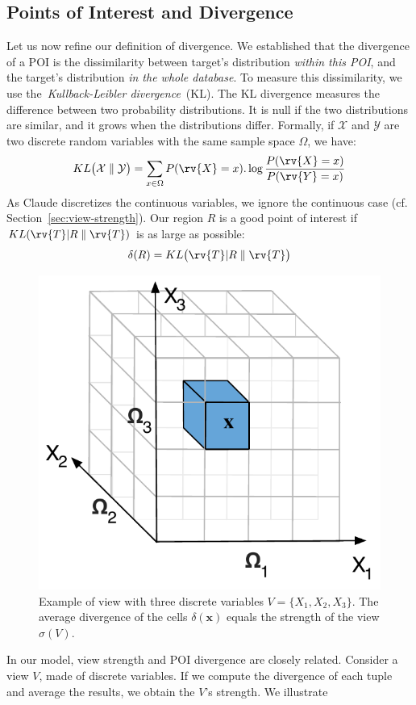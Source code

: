 \subsection{Points of Interest and Divergence}
Let us now refine our definition of divergence. We established that the
divergence of a POI is the dissimilarity between target's distribution
\emph{within this POI}, and the target's distribution \emph{in the whole
database}.  To measure this dissimilarity, we use the~\emph{Kullback-Leibler
divergence}~(KL).  The KL divergence measures the difference between two
probability distributions. It is null if the two distributions are similar, and
it grows when the distributions differ.  Formally, if $\mathcal{X}$ and
$\mathcal{Y}$ are two discrete random variables with the same sample space
$\Omega$, we have:
\begin{equation}\label{eq:KL_disc} 
    KL\big( \mathcal{X} \parallel \mathcal{Y} \big) = 
    \sum_{x\in \Omega} P(\rv{X} = x).\log{\frac{P(\rv{X} = x)}{P(\rv{Y} = x)}} 
\end{equation}
As Claude discretizes the continuous variables, we ignore the continuous case
(cf.  Section~\ref{sec:view-strength}). Our region $R$ is a good point of
interest if $KL ( \rv{T} |R \parallel \rv{T} )$ is as large as possible:
\begin{equation}\label{eq:divergence}
    \delta(R) = KL \big( \rv{T} | R \parallel \rv{T}\big)
\end{equation}
\begin{figure}[t!]
\centering
\includegraphics[width=0.4\columnwidth]{images/3Dtest}
\caption{Example of view with three discrete variables $V = \{X_1, X_2, X_3\}$.
The average divergence of the cells $\delta(\mathbf{x})$ equals the strength of
the view  $\sigma(V)$.}
\label{fig:binningexample}
\end{figure}
In our model, view strength and POI divergence are closely related.  Consider a
view $V$, made of discrete variables. If we compute the divergence of each
tuple and average the results, we obtain the $V$'s strength.  We illustrate
